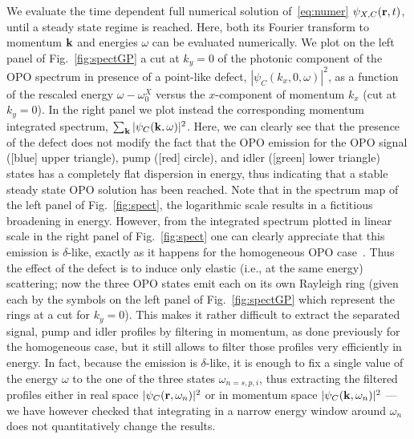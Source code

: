 \begin{subappendices}
We evaluate the time dependent full numerical solution
of~\eqref{eq:numer} $\psi_{X,C} (\mathbf{r},t)$, until a steady state
regime is reached. Here, both its Fourier transform to momentum
$\mathbf{k}$ and energies $\omega$ can be evaluated numerically.
%
We plot on the left panel of Fig.~\ref{fig:spectGP} a cut at $k_y=0$
of the photonic component of the OPO spectrum in presence of a
point-like defect, $|\psi_C(k_x,0,\omega)|^2$, as a function of the
rescaled energy $\omega - \omega_0^X$ versus the $x$-component of
momentum $k_x$ (cut at $k_y=0$). In the right panel we plot instead
the corresponding momentum integrated spectrum, $\sum_{\mathbf{k}}
|\psi_C(\mathbf{k},\omega)|^2$.
%
Here, we can clearly see that the presence of the defect does not
modify the fact that the OPO emission for the OPO signal ([blue] upper
triangle), pump ([red] circle), and idler ([green] lower triangle)
states has a completely flat dispersion in energy, thus indicating
that a stable steady state OPO solution has been reached. Note that in
the spectrum map of the left panel of Fig.~\ref{fig:spect}, the
logarithmic scale results in a fictitious broadening in
energy. However, from the integrated spectrum plotted in linear scale
in the right panel of Fig.~\ref{fig:spect} one can clearly appreciate
that this emission is $\delta$-like, exactly as it happens for the
homogeneous OPO case~\cite{9783642241857}.
%
Thus the effect of the defect is to induce only elastic (i.e., at the
same energy) scattering; now the three OPO states emit each on its own
Rayleigh ring (given each by the symbols on the left panel of
Fig.~\ref{fig:spectGP} which represent the rings at a cut for
$k_y=0$). This makes it rather difficult to extract the separated
signal, pump and idler profiles by filtering in momentum, as done
previously for the homogeneous case, but it still allows to filter
those profiles very efficiently in energy. In fact, because the
emission is $\delta$-like, it is enough to fix a single value of the
energy $\omega$ to the one of the three states $\omega_{n=s,p,i}$,
thus extracting the filtered profiles either in real space
$|\psi_C(\mathbf{r},\omega_n)|^2$ or in momentum space
$|\psi_C(\mathbf{k},\omega_n)|^2$ --- we have however checked that
integrating in a narrow energy window around $\omega_n$ does not
quantitatively change the results.


\end{subappendices}
